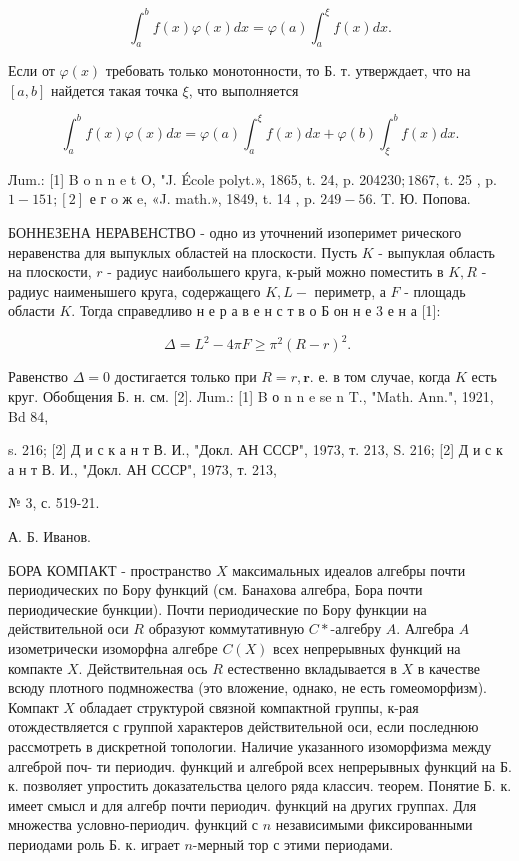 \documentclass[10pt]{article}
\begin{document}
\[

\int_{a}^{b} f(x) \varphi(x) d x=\varphi(a) \int_{a}^{\xi} f(x) d x .

\]



Если от $\varphi(x)$ требовать только монотонности, то Б. т. утверждает, что на $[a, b]$ найдется такая точка $\xi$, что выполняется



\[

\int_{a}^{b} f(x) \varphi(x) d x=\varphi(a) \int_{a}^{\xi} f(x) d x+\varphi(b) \int_{\xi}^{b} f(x) d x .

\]



Лum.: [1] B o n n e t O, "J. École polyt.», 1865, t. 24, p. 204$230 ; 1867$, t. 25 , p. $1-151 ;[2]$ е г o ж e, «J. math.», 1849, t. 14 , p. $249-56$. T. Ю. Попова.



БОННЕЗЕНА НЕРАВЕНСТВО - одно из уточнений изоперимет рического неравенства для выпуклых областей на плоскости. Пусть $K$ - выпуклая область на плоскости, $r$ - радиус наибольшего круга, к-рый можно поместить в $K, R$ - радиус наименышего круга, содержащего $K, L-$ периметр, а $F$ - площадь области $K$. Тогда справедливо н е р а в е н с т в о Б он н е 3 е н а [1]:



\[

\Delta=L^{2}-4 \pi F \geqslant \pi^{2}(R-r)^{2} \text {. }

\]



Равенство $\Delta=0$ достигается только при $R=r, \mathbf{r}$. е. в том случае, когда $K$ есть круг. Обобщения Б. н. см. [2]. Лum.: [1] B о n n e se n T., "Math. Ann.", 1921, Bd 84,

s. 216; [2] Д и с к а н т В. И., "Докл. АН СССР", 1973, т. 213, S. 216; [2] Д и с к а н т В. И., "Докл. АН СССР", 1973, т. 213,

№ 3, с. 519-21.

А. Б. Иванов.



БОРА КОМПАКТ - пространство $X$ максимальных идеалов алгебры почти периодических по Бору функций (см. Банахова алгебра, Бора почти периодические бункции). Почти периодические по Бору функции на действительной оси $R$ образуют коммутативную $C *$-алгебру $A$. Алгебра $A$ изометрически изоморфна алгебре $C(X)$ всех непрерывных функций на компакте $X$. Действительная ось $R$ естественно вкладывается в $X$ в качестве всюду плотного подмножества (это вложение, однако, не есть гомеоморфизм). Компакт $X$ обладает структурой связной компактной группы, к-рая отождествляется с группой характеров действительной оси, если последнюю рассмотреть в дискретной топологии. Наличие указанного изоморфизма между алгеброй поч- ти периодич. функций и алгеброй всех непрерывных функций на Б. к. позволяет упростить доказательства целого ряда классич. теорем. Понятие Б. к. имеет смысл и для алгебр почти периодич. функций на других группах. Для множества условно-периодич. функций с $n$ независимыми фиксированными периодами роль Б. к. играет $n$-мерный тор с этими периодами.
\end{document}
